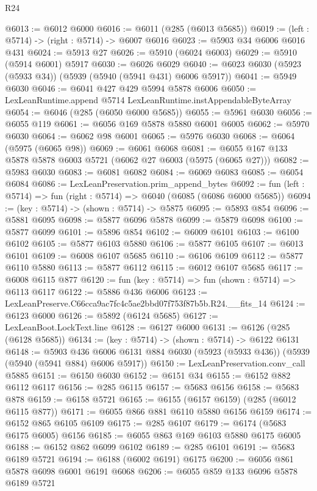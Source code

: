 \begin{lexlean}{R24}
\begin{coremodule}
@6013 := @6012 @6000
@6016 := @6011 (@285 (@6013 @5685))
@6019 := (left : @5714) -> (right : @5714) -> @6007 @6016
@6023 := @5903 @34 @6006 @6016 @431
@6024 := @5913 @27
@6026 := @5910 (@6024 @6003)
@6029 := @5910 (@5914 @6001) @5917
@6030 := @6026 @6029
@6040 := @6023 @6030 (@5923 (@5933 @34)) (@5939 (@5940 (@5941 @431) @6006 @5917))
@6041 := @5949 @6030
@6046 := @6041 @427 @429 @5994 @5878 @6006
@6050 := LexLeanRuntime.append @5714 LexLeanRuntime.instAppendableByteArray
@6054 := @6046 (@285 (@6050 @6000 @5685))
@6055 := @5961 @6030
@6056 := @6055 @119
@6061 := @6056 @169 @5878 @5880 @6001 @6005
@6062 := @5970 @6030
@6064 := @6062 @98 @6001
@6065 := @5976 @6030
@6068 := @6064 (@5975 (@6065 @98))
@6069 := @6061 @6068
@6081 := @6055 @167 @133 @5878 @5878 @6003 @5721 (@6062 @27 @6003 (@5975 (@6065 @27)))
@6082 := @5983 @6030
@6083 := @6081 @6082
@6084 := @6069 @6083
@6085 := @6054 @6084
@6086 := LexLeanPreservation.prim_append_bytes
@6092 := fun (left : @5714) => fun (right : @5714) => @6040 (@6085 (@6086 @6000 @5685))
@6094 := (key : @5714) -> (shown : @5714) -> @5875
@6095 := @5893 @854
@6096 := @5881 @6095
@6098 := @5877 @6096 @5878
@6099 := @5879 @6098
@6100 := @5877 @6099
@6101 := @5896 @854
@6102 := @6009 @6101
@6103 := @6100 @6102
@6105 := @5877 @6103 @5880
@6106 := @5877 @6105
@6107 := @6013 @6101
@6109 := @6008 @6107 @5685
@6110 := @6106 @6109
@6112 := @5877 @6110 @5880
@6113 := @5877 @6112
@6115 := @6012 @6107 @5685
@6117 := @6008 @6115 @877
@6120 := fun (key : @5714) => fun (shown : @5714) => @6113 @6117
@6122 := @5886 @436 @6006
@6123 := LexLeanPreserve.C66cca9ac7fc4c5ae2bbd07f753f87b5b.R24.__fits_14
@6124 := @6123 @6000
@6126 := @5892 (@6124 @5685)
@6127 := LexLeanBoot.LockText.line
@6128 := @6127 @6000
@6131 := @6126 (@285 (@6128 @5685))
@6134 := (key : @5714) -> (shown : @5714) -> @6122 @6131
@6148 := @5903
    @436
    @6006
    @6131
    @884
    @6030
    (@5923 (@5933 @436))
    (@5939 (@5940 (@5941 @884) @6006 @5917))
@6150 := LexLeanPreservation.conv_call @5885
@6151 := @6150 @6030
@6152 := @6151 @34
@6155 := @6152 @882 @6112 @6117
@6156 := @285 @6115
@6157 := @5683 @6156
@6158 := @5683 @878
@6159 := @6158 @5721
@6165 := @6155 (@6157 @6159) (@285 (@6012 @6115 @877))
@6171 := @6055 @866 @881 @6110 @5880 @6156 @6159
@6174 := @6152 @865 @6105 @6109
@6175 := @285 @6107
@6179 := @6174 (@5683 @6175 @6005) @6156
@6185 := @6055 @863 @169 @6103 @5880 @6175 @6005
@6188 := @6152 @862 @6099 @6102
@6189 := @285 @6101
@6191 := @5683 @6189 @5721
@6194 := @6188 (@6002 @6191) @6175
@6200 := @6056 @861 @5878 @6098 @6001 @6191 @6068
@6206 := @6055 @859 @133 @6096 @5878 @6189 @5721

\end{coremodule}
\end{lexlean}
